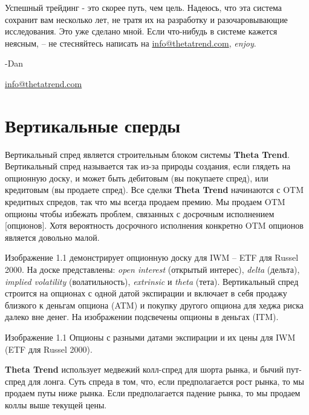\documentclass[12pt,DIV=18]{scrartcl}
\begin{document}
\bigskip

Успешный трейдинг - это скорее путь, чем цель. Надеюсь, что эта система сохранит вам несколько лет, не тратя их на разработку и разочаровывающие исследования. Это уже сделано мной. Если что-нибудь в системе кажется неясным, -- не стесняйтесь написать на \textcolor{Blue}{\href{mailto:info@thetatrend.com}{info@thetatrend.com}}, \textit{enjoy}.

\bigskip

-Dan\par
\textcolor{Blue}{\href{mailto:info@thetatrend.com}{info@thetatrend.com}}

\section{Вертикальные сперды}
\label{chapter1}

\bigskip

Вертикальный спред является строительным блоком системы \textbf{Theta Trend}. Вертикальный спред называется так из-за природы создания, если глядеть на опционную доску, и может быть дебитовым (вы покупаете спред), или кредитовым (вы продаете спред). Все сделки \textbf{Theta Trend} начинаются с OTM кредитных спредов, так что мы всегда продаем премию. Мы продаем OTM опционы чтобы избежать проблем, связанных с досрочным исполнением [опционов]. Хотя вероятность досрочного исполнения конкретно OTM опционов является довольно малой.

\bigskip

Изображение 1.1 демонстрирует опционную доску для IWM -- ETF для Russel 2000. На доске представлены: \textit{open interest} (открытый интерес), \textit{delta} (дельта), \textit{implied  volatility} (волатильность), \textit{extrinsic} и \textit{theta} (тета). Вертикальный спред строится на опционах с одной датой экспирации и включает в себя продажу близкого к деньгам опциона (ATM) и покупку другого опциона для хеджа риска далеко вне денег. На изображении подсвечены опционы в деньгах (ITM).

\bigskip

Изображение 1.1 Опционы с разными датами экспирации и их цены для IWM (ETF для Russel 2000).

\bigskip

\textbf{Theta Trend} использует медвежий колл-спред для шорта рынка, и бычий пут-спред для лонга. Суть спреда в том, что, если предполагается рост рынка, то мы продаем путы ниже рынка. Если предполагается падение рынка, то мы продаем коллы выше текущей цены.
\end{document}
